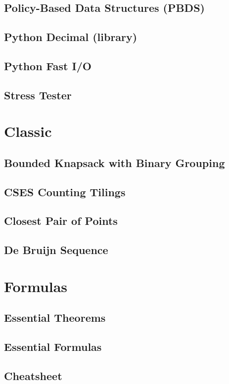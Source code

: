 \subsection{Policy-Based Data Structures (PBDS)}

\subsection{Python Decimal (library)}

\subsection{Python Fast I/O}

\subsection{Stress Tester}

\section{Classic}
\subsection{Bounded Knapsack with Binary Grouping}

\subsection{CSES Counting Tilings}

\subsection{Closest Pair of Points}

\subsection{De Bruijn Sequence}

\section{Formulas}
\subsection{Essential Theorems}

\subsection{Essential Formulas}

\subsection{Cheatsheet}

